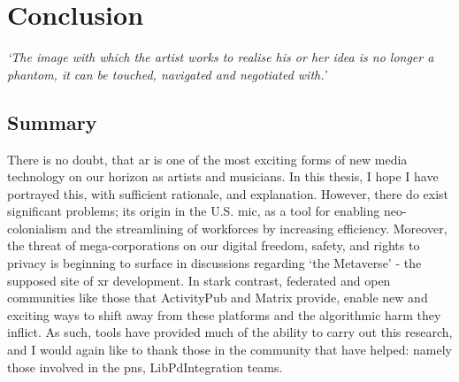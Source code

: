 \chapter{Conclusion}{}
\label{sec: conclusion}
\epigraph{\textit{`The image with which the artist works to realise his or her idea is no longer a phantom, it can be touched, navigated and negotiated with.'}}{\citep[p.5]{ryan1991}}


\clearpage

\section{Summary}\label{sec: conclusion-summary}
There is no doubt, that \gls{ar} is one of the most exciting forms of new media technology on our horizon as artists and musicians. In this thesis, I hope I have portrayed this, with sufficient rationale, and explanation. However, there do exist significant problems; its origin in the U.S. \gls{mic}, as a tool for enabling neo-colonialism and the streamlining of workforces by increasing efficiency. Moreover, the threat of mega-corporations on our digital freedom, safety, and rights to privacy is beginning to surface in discussions regarding `the Metaverse' - the supposed site of \gls{xr} development. In stark contrast, federated and open communities like those that ActivityPub and Matrix provide, enable new and exciting ways to shift away from these platforms and the algorithmic harm they inflict. As such,  tools have provided much of the ability to carry out this research, and I would again like to thank those in the community that have helped: namely those involved in the \gls{pns}, LibPdIntegration teams.

